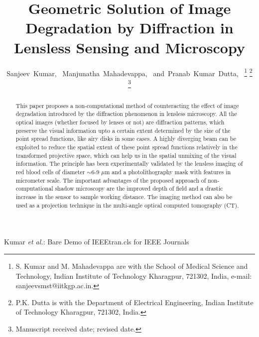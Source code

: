\documentclass[journal]{IEEEtran}
\begin{document}
%
\title{Geometric Solution of Image Degradation by Diffraction in Lensless Sensing and Microscopy}
%
%

%

\author{Sanjeev~Kumar,~\IEEEmembership{}
        Manjunatha~Mahadevappa,~
        and~Pranab~Kumar~Dutta,~%
\thanks{S. Kumar and M. Mahadevappa are with the School of Medical Science and Technology, Indian Institute of Technology Kharagpur, 721302, India, e-mail: sanjeevsmst@iitkgp.ac.in.}%
\thanks{P.K. Dutta is with the Department of Electrical Engineering, Indian Institute of Technology Kharagpur, 721302, India.}%



\thanks{Manuscript received date; revised date.}}





%
{Kumar \MakeLowercase{\textit{et al.}}: Bare Demo of IEEEtran.cls for IEEE Journals}




\maketitle

\begin{abstract}
This paper proposes a non-computational method of counteracting the effect of image degradation introduced by the diffraction phenomenon in lensless microscopy. All the optical images (whether focused by lenses or not) are diffraction patterns, which preserve the visual information upto a certain extent determined by the size of the point spread functions, like airy disks in some cases. A highly diverging beam can be exploited to reduce the spatial extent of these point spread functions relatively in the transformed projective space, which can help us in the spatial unmixing of the visual information. The principle has been experimentally validated by the lensless imaging of red blood cells of diameter $\sim$6-9 $\mu$m and a photolithography mask with features in micrometer scale. The important advantages of the proposed approach of non-computational shadow microscopy are the improved depth of field and a drastic increase in the sensor to sample working distance. The imaging method can also be used as a projection technique in the multi-angle optical computed tomography (CT).
\end{abstract}
\end{document}
